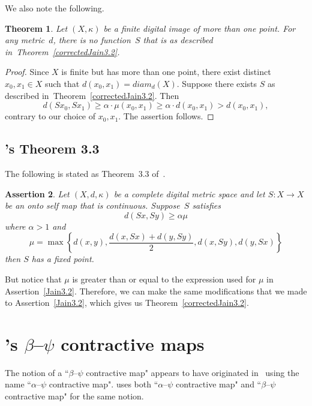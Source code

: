 \documentclass{article}
\newtheorem{thm}{Theorem}
\newtheorem{assert}[thm]{Assertion}
\numberwithin{thm}{section}
\begin{document}
We also note the
following.

\begin{thm}
    Let $(X,\kappa)$
    be a finite
    digital image
    of more than
    one point.
    For any metric~$d$, 
    there is no
    function~$S$
    that is as
    described
    in~Theorem~\ref{correctedJain3.2}.
\end{thm}

\begin{proof}
    Since $X$ is
    finite but has more than one point, there
    exist distinct 
    $x_0,x_1 \in X$ such
    that $d(x_0,x_1) = diam_d(X)$.
    Suppose there
    exists $S$ as
    described
    in~Theorem~\ref{correctedJain3.2}.
    Then
    \[ d(Sx_0,Sx_1)
    \ge \alpha \cdot \mu(x_0,x_1) \ge \alpha \cdot d(x_0,x_1) >
    d(x_0,x_1),
    \]
    contrary to our
    choice of $x_0,x_1$.
    The assertion 
    follows. 
\end{proof}

\subsection{\cite{Jain18}'s Theorem 3.3}
The following is stated as
Theorem~3.3 of~\cite{Jain18}.

\begin{assert}
    Let $(X,d,\kappa)$
    be a complete digital metric space and
    let $S: X \to X$ be
    an onto self map that is
    continuous. Suppose~$S$
    satisfies
    \[ d(Sx,Sy) \ge 
       \alpha \mu
    \]
    where $\alpha > 1$ and
    \[ \mu = \max \left \{ 
    d(x,y), 
    \frac{d(x,Sx)+d(y,Sy)}{2}, d(x,Sy), d(y,Sx)
    \right \}
    \]
    then $S$ has a fixed
    point.
\end{assert}

But notice that $\mu$ is greater than or equal to the
expression used for $\mu$ in Assertion~\ref{Jain3.2}. 
Therefore, we can make the same
modifications that we
made to Assertion~\ref{Jain3.2},
which gives us
Theorem~\ref{correctedJain3.2}.

\section{\cite{JyotiRani17}'s $\beta$--$\psi$ contractive maps}
The notion of a
``$\beta$--$\psi$ contractive map"
appears to have originated in~\cite{SametEtAl}
using the name ``$\alpha$--$\psi$ contractive map".
\cite{JyotiRani17} uses both 
``$\alpha$--$\psi$ contractive map" and
``$\beta$--$\psi$ contractive map" for the same notion.
\end{document}
